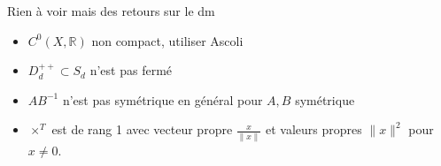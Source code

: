 \begin{remarque}
    Rien à voir mais des retours sur le dm
     \begin{itemize}
         \item $C^0(X,\mathbb{R} )$ non compact, utiliser Ascoli
         \item $D_d^{++}\subset S_d$ n'est pas fermé
            \item $AB^{-1} $ n'est pas symétrique en général pour $A,B$ symétrique
        \item $\times ^T$ est de rang 1 avec vecteur propre $\frac{x}{\|x\|}$ et valeurs propres $\|x\|^2$ pour $x\neq 0$.
     \end{itemize}
\end{remarque}
